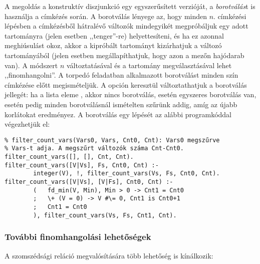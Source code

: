 A megoldás a konstruktív diszjunkció egy egyszerűsített verzióját, a \emph{borotválás}t
is használja a címkézés során. A borotválás lényege az, hogy minden $n$. címkézési
lépésben a címkézésből hátralévő változók mindegyikét megpróbáljuk egy adott
tartományra (jelen esetben ,,tenger''-re) helyettesíteni, és ha ez azonnal meghiúsulást
okoz, akkor a kipróbált tartományt kizárhatjuk a változó tartományából (jelen esetben
megállapíthatjuk, hogy azon a mezőn hajódarab van). A módszert $n$ változtatásával
és a tartomány megválasztásával lehet ,,finomhangolni''. A torpedó feladatban alkalmazott
borotválást minden szín címkézése előtt megismételjük. A 
opción keresztül változtathatjuk a borotválás jellegét: ha a lista eleme ,
akkor nincs borotválás,  esetén egyszeres borotválás van,  esetén
pedig minden borotválásnál ismételten szűrünk addig, amíg az újabb korlátokat eredményez.
\br
A borotválás egy lépését az alábbi programkóddal végezhetjük el:
\begin{verbatim}
% filter_count_vars(Vars0, Vars, Cnt0, Cnt): Vars0 megszűrve
% Vars-t adja. A megszűrt változók száma Cnt-Cnt0.
filter_count_vars([], [], Cnt, Cnt).
filter_count_vars([V|Vs], Fs, Cnt0, Cnt) :-
        integer(V), !, filter_count_vars(Vs, Fs, Cnt0, Cnt).
filter_count_vars([V|Vs], [V|Fs], Cnt0, Cnt) :-
        (   fd_min(V, Min), Min > 0 -> Cnt1 = Cnt0
        ;   \+ (V = 0) -> V #\= 0, Cnt1 is Cnt0+1
        ;   Cnt1 = Cnt0
        ), filter_count_vars(Vs, Fs, Cnt1, Cnt).
\end{verbatim}

\subsubsection{További finomhangolási lehetőségek}

A szomszédsági reláció megvalósítására több lehetőség is kínálkozik:

